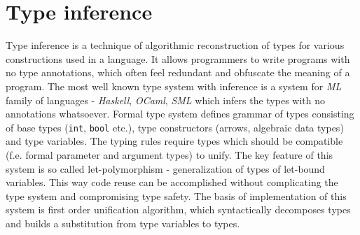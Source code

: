\documentclass[inz, english, shortabstract]{iithesis}
\begin{document}
\section{Type inference}
Type inference is a technique of algorithmic reconstruction of types for various constructions used in a language.
It allows programmers to write programs with no type annotations, which often feel redundant and obfuscate the meaning of a program.
The most well known type system with inference is a system for \emph{ML} family of languages - \emph{Haskell}, \emph{OCaml}, \emph{SML} which infers the types with no annotations whatsoever.
Formal type system defines grammar of types consisting of base types (\texttt{int}, \texttt{bool} etc.), type constructors (arrows, algebraic data types) and type variables.
The typing rules require types which should be compatible (f.e. formal parameter and argument types) to unify.
The key feature of this system is so called let-polymorphism - generalization of types of let-bound variables.
This way code reuse can be accomplished without complicating the type system and compromising type safety.
The basis of implementation of this system is first order unification algorithm, which syntactically decomposes types and builds a substitution from type variables to types.
\end{document}
